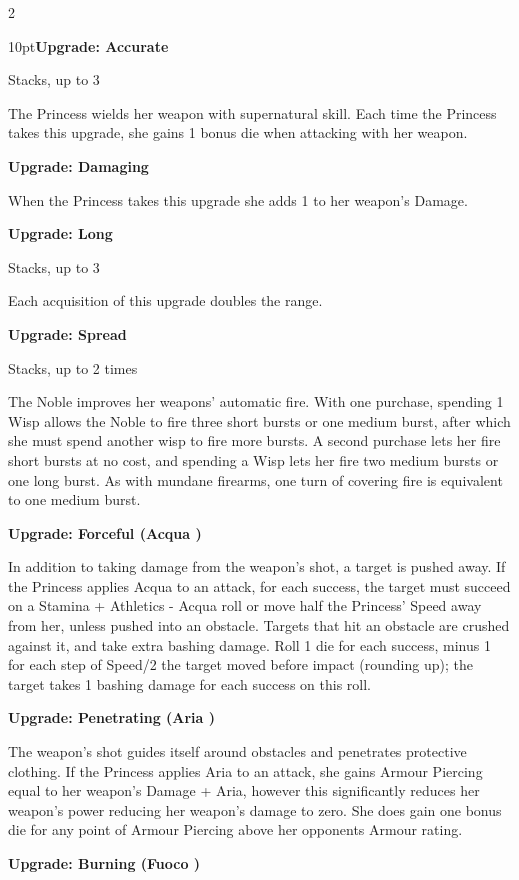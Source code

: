 \begin{multicols}{2}
\begin{myindentpar}{10pt}\textbf{Upgrade: Accurate}

Stacks, up to 3

The Princess wields her weapon with supernatural skill. Each time the Princess takes this upgrade, she gains 1 bonus die when attacking with her weapon.

\textbf{Upgrade: Damaging}

When the Princess takes this upgrade she adds 1 to her weapon’s Damage. 

\textbf{Upgrade: Long}

Stacks, up to 3

Each acquisition of this upgrade doubles the range.

\textbf{Upgrade: Spread}

Stacks, up to 2 times

The Noble improves her weapons' automatic fire. With one purchase, spending 1 Wisp allows the Noble to fire three short bursts or one medium burst, after which she must spend another wisp to fire more bursts. A second purchase lets her fire short bursts at no cost, and spending a Wisp lets her fire two medium bursts or one long burst. As with mundane firearms, one turn of covering fire is equivalent to one medium burst.

\textbf{Upgrade: Forceful (Acqua \textbullet\textbullet)}

In addition to taking damage from the weapon's shot, a target is pushed away. If the Princess applies Acqua to an attack, for each success, the target must succeed on a Stamina + Athletics - Acqua roll or move half the Princess' Speed away from her, unless pushed into an obstacle. Targets that hit an obstacle are crushed against it, and take extra bashing damage. Roll 1 die for each success, minus 1 for each step of Speed/2 the target moved before impact (rounding up); the target takes 1 bashing damage for each success on this roll.

\textbf{Upgrade: Penetrating (Aria \textbullet\textbullet)}

The weapon's shot guides itself around obstacles and penetrates protective clothing. If the Princess applies Aria to an attack, she gains Armour Piercing equal to her weapon's Damage + Aria, however this significantly reduces her weapon's power reducing her weapon's damage to zero. She does gain one bonus die for any point of Armour Piercing above her opponents Armour rating. 

\textbf{Upgrade: Burning (Fuoco \textbullet\textbullet)}


\end{myindentpar}
\end{multicols}
